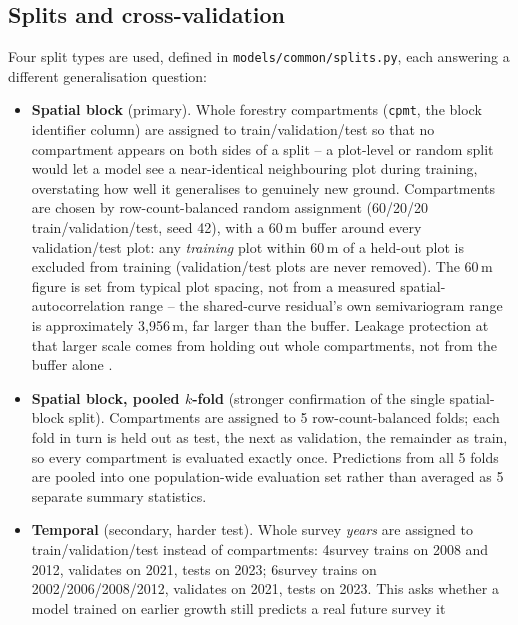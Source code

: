 \documentclass[11pt,a4paper]{report}
\begin{document}
\subsection{Splits and cross-validation}
\label{sec:splits}

Four split types are used, defined in \texttt{models/common/splits.py}, each answering a
different generalisation question:

\begin{itemize}
\setlength\itemsep{0pt}
\item \textbf{Spatial block} (primary). Whole forestry compartments (\texttt{cpmt}, the block
  identifier column) are assigned to train/validation/test so that no compartment appears on both
  sides of a split -- a plot-level or random split would let a model see a near-identical
  neighbouring plot during training, overstating how well it generalises to genuinely new
  ground. Compartments are chosen by row-count-balanced random assignment (60/20/20
  train/validation/test, seed 42), with a 60\,m buffer around every validation/test plot: any
  \emph{training} plot within 60\,m of a held-out plot is excluded from training (validation/test
  plots are never removed). The 60\,m figure is set from typical plot spacing, not from a
  measured spatial-autocorrelation range -- the shared-curve residual's own semivariogram range is
  approximately 3{,}956\,m, far larger than the buffer. Leakage protection at that larger scale
  comes from holding out whole compartments, not from the buffer alone
  \citep{roberts2017}. %
\item \textbf{Spatial block, pooled $k$-fold} (stronger confirmation of the single spatial-block
  split). Compartments are assigned to 5 row-count-balanced folds; each fold in turn is held out
  as test, the next as validation, the remainder as train, so every compartment is evaluated
  exactly once. Predictions from all 5 folds are pooled into one population-wide evaluation set
  rather than averaged as 5 separate summary statistics.
\item \textbf{Temporal} (secondary, harder test). Whole survey \emph{years} are assigned to
  train/validation/test instead of compartments: 4survey trains on 2008 and 2012, validates on
  2021, tests on 2023; 6survey trains on 2002/2006/2008/2012, validates on 2021, tests on 2023.
  This asks whether a model trained on earlier growth still predicts a real future survey it

\end{itemize}
\end{document}
